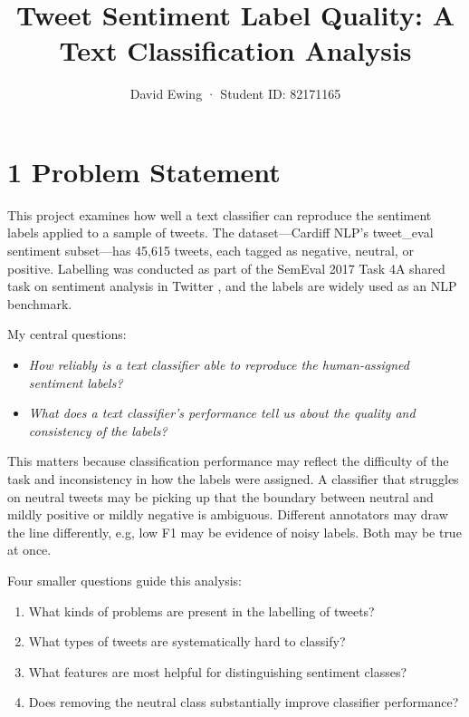 \documentclass[12pt]{article}
\title{Tweet Sentiment Label Quality: A Text Classification Analysis}
\author{David Ewing · Student ID: 82171165}
\date{}
\begin{document}
\maketitle

\section*{1 Problem Statement}



This project examines how well a text classifier can reproduce the sentiment labels applied to a sample of tweets. The dataset---Cardiff NLP's tweet\_eval sentiment subset---has 45,615 tweets, each tagged as negative, neutral, or positive. Labelling was conducted as part of the SemEval 2017 Task 4A shared task on sentiment analysis in Twitter \citep{rosenthal2017semeval}, and the labels are widely used as an NLP benchmark.

My central questions: 

\begin{itemize}
  \item \textit{How reliably is a text classifier able to reproduce the human-assigned sentiment labels?}
  \item \textit{What does a text classifier's performance tell us about the quality and consistency of the labels?}
\end{itemize}

This matters because  classification performance may reflect  the difficulty of the task and inconsistency in how the labels were assigned. 
A classifier that struggles on neutral tweets may be picking up that the boundary
between neutral and mildly positive or mildly negative is ambiguous.
Different annotators may draw the line differently,
 e.g, low F1 may be evidence of noisy labels. Both may be true at once.

Four smaller questions guide this analysis:

\begin{enumerate}

  \item What kinds of problems are present in the labelling of tweets?

  \item What types of tweets are systematically hard to classify?

  \item What features are most helpful for distinguishing sentiment classes?

  \item Does removing the neutral class substantially improve classifier performance?

\end{enumerate}
\end{document}
